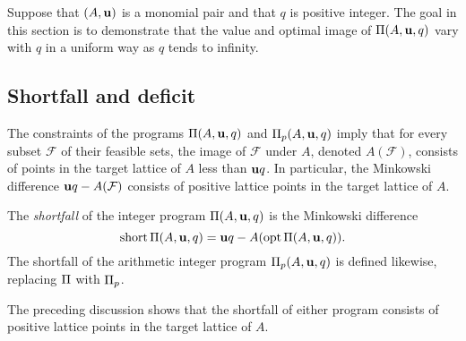 \documentclass[11pt]{amsart}
\newcommand{\short}{\operatorname{short}}
\begin{document}
Suppose that $(A, \mathbf{u})$ is a monomial pair and that $q$ is positive integer.
The goal in this section is to demonstrate that the value and optimal image of $\Pi(A, \mathbf{u}, q)$ vary with $q$ in a uniform way as $q$ tends to infinity.

\subsection{Shortfall and deficit}

The constraints of the programs $\Pi(A,\mathbf{u},q)$ and $\Pi_p(A,\mathbf{u},q)$ imply that for every subset $\mathcal{F}$ of their feasible sets, the image of $\mathcal{F}$ under $A$, denoted $A(\mathcal{F})$, consists of points in the target lattice of $A$ less than $\mathbf{u}q$.
In particular, the Minkowski difference $\mathbf{u}q-A(\mathcal{F})$ consists of positive lattice points in the target lattice of $A$.

\begin{definition}
   The \emph{shortfall} of the integer program $\Pi(A, \mathbf{u}, q)$ is the Minkowski difference
   \[ \short \IP(A, \vv{u}, q) = \vv{u}q - A( \opt \IP(A, \vv{u}, q)).\]
   The shortfall of the arithmetic integer program $\Pi_p(A, \mathbf{u}, q)$ is defined likewise, replacing $\Pi$ with $\Pi_p$.
\end{definition}

The preceding discussion shows that the shortfall of either program consists of positive lattice points in the target lattice of $A$.
\end{document}

